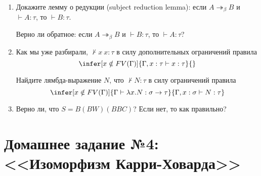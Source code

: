 \documentclass[10pt,a4paper,oneside]{article}
\begin{document}
\begin{enumerate}
%
%

\item Докажите лемму о редукции (subject reduction lemma): если $A \twoheadrightarrow_\beta B$ и $\vdash A: \tau$, то
$\vdash B: \tau$.

Верно ли обратное: если $A \twoheadrightarrow_\beta B$ и $\vdash B: \tau$, то
$\vdash A: \tau$?

\item Как мы уже разбирали, $\not\vdash x\ x:\tau$ в силу дополнительных ограничений
правила
$$\infer[x \notin FV(\Gamma)]{\Gamma, x:\tau\vdash x:\tau}{}$$

Найдите лямбда-выражение $N$, что $\not\vdash N:\tau$ в силу ограничений правила
$$\infer[x \notin FV(\Gamma)]{\Gamma \vdash \lambda x.N:\sigma\to\tau}{\Gamma, x:\sigma \vdash N:\tau}$$

\item Верно ли, что $S = B(BW)(BBC)$? Если нет, то как правильно?
\end{enumerate}

\section*{Домашнее задание №4: <<Изоморфизм Карри-Ховарда>>}
\end{document}
